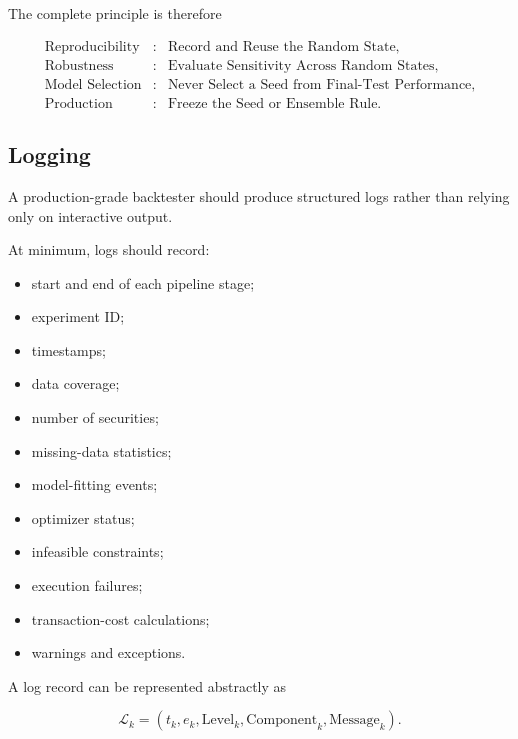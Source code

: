 \documentclass[11pt,a4paper]{article}
\begin{document}
The complete principle is therefore

\begin{equation}
\boxed{
\begin{aligned}
\text{Reproducibility}
&:
&
\text{Record and Reuse the Random State},
\\
\text{Robustness}
&:
&
\text{Evaluate Sensitivity Across Random States},
\\
\text{Model Selection}
&:
&
\text{Never Select a Seed from Final-Test Performance},
\\
\text{Production}
&:
&
\text{Freeze the Seed or Ensemble Rule}.
\end{aligned}
}
\end{equation}


\subsection{Logging}
\label{subsec:logging}

A production-grade backtester should produce structured logs rather than relying
only on interactive output.

At minimum, logs should record:

\begin{itemize}
    \item start and end of each pipeline stage;
    \item experiment ID;
    \item timestamps;
    \item data coverage;
    \item number of securities;
    \item missing-data statistics;
    \item model-fitting events;
    \item optimizer status;
    \item infeasible constraints;
    \item execution failures;
    \item transaction-cost calculations;
    \item warnings and exceptions.
\end{itemize}

A log record can be represented abstractly as

\begin{equation}
\boxed{
\mathcal{L}_k
=
\left(
t_k,
e_k,
\mathrm{Level}_k,
\mathrm{Component}_k,
\mathrm{Message}_k
\right).
}
\end{equation}
\end{document}
